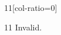 \documentclass[paper=A4]{ropas-poster}
\begin{document}
\begin{postergrid}{1}{1}[col-ratio={0}]
\begin{posterblock}{1}{1}
Invalid.
\end{posterblock}
\end{postergrid}
\end{document}
